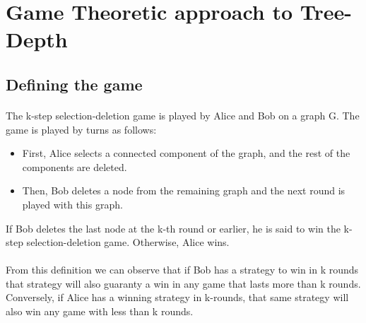 \section{Game Theoretic approach to Tree-Depth}

\subsection{Defining the game}
\paragraph{}
The k-step selection-deletion game is played by Alice and Bob on a graph G. The game is played by turns as follows:
\begin{itemize}
  \item First, Alice selects a connected component of the graph, and the rest of the components are deleted.
  \item Then, Bob deletes a node from the remaining graph and the next round is played with this graph.
\end{itemize}

If Bob deletes the last node at the k-th round or earlier, he is said to win the k-step selection-deletion game. Otherwise, Alice wins.
\paragraph{}
From this definition we can observe that if Bob has a strategy to win in k rounds that strategy will also guaranty a win in any game that lasts more than k rounds. Conversely, if Alice has a winning strategy in k-rounds, that same strategy will also win any game with less than k rounds.

